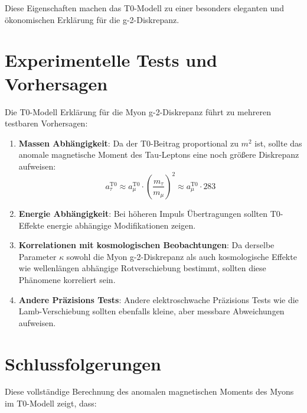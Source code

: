 \documentclass[12pt,a4paper]{article}
\begin{document}
	Diese Eigenschaften machen das T0-Modell zu einer besonders eleganten und ökonomischen Erklärung für die g-2-Diskrepanz.
	
	\section{Experimentelle Tests und Vorhersagen}
	
	Die T0-Modell Erklärung für die Myon g-2-Diskrepanz führt zu mehreren testbaren Vorhersagen:
	
	\begin{enumerate}
		\item \textbf{Massen Abhängigkeit}: Da der T0-Beitrag proportional zu $m^2$ ist, sollte das anomale magnetische Moment des Tau-Leptons eine noch größere Diskrepanz aufweisen:
		\begin{equation}
			a_\tau^{\text{T0}} \approx a_\mu^{\text{T0}} \cdot \left(\frac{m_\tau}{m_\mu}\right)^2 \approx a_\mu^{\text{T0}} \cdot 283
		\end{equation}
		
		\item \textbf{Energie Abhängigkeit}: Bei höheren Impuls Übertragungen sollten T0-Effekte energie abhängige Modifikationen zeigen.
		
		\item \textbf{Korrelationen mit kosmologischen Beobachtungen}: Da derselbe Parameter $\kappa$ sowohl die Myon g-2-Diskrepanz als auch kosmologische Effekte wie wellenlängen abhängige Rotverschiebung bestimmt, sollten diese Phänomene korreliert sein.
		
		\item \textbf{Andere Präzisions Tests}: Andere elektroschwache Präzisions Tests wie die Lamb-Verschiebung sollten ebenfalls kleine, aber messbare Abweichungen aufweisen.
	\end{enumerate}
	
	\section{Schlussfolgerungen}
	
	Diese vollständige Berechnung des anomalen magnetischen Moments des Myons im T0-Modell zeigt, dass:
	
\end{document}
